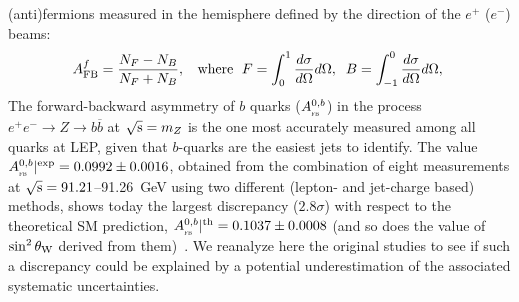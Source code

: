 \documentclass{moriond}
\newcommand{\sqrts}{\sqrt{\rm s}}
\newcommand{\epem}{e^+e^-}
\providecommand{\bbbar}{b\overline{b}}
\newcommand{\AFBb}  {A_{_{\textsc{fb}}}^{0,b}}
\newcommand{\weakang}  {\sin^2\theta_{\rm W}}
\begin{document}
(anti)fermions measured in the hemisphere defined by the direction of the $e^+$ ($e^-$) beams: %
\begin{eqnarray}
A_{\rm FB}^f=\frac{N_F-N_B}{N_F+N_B},\;\;\mbox{ where }\;F=\int_0^1 \frac{d\sigma}{d\Omega}d\Omega,\;\;B=\int_{-1}^0 \frac{d\sigma}{d\Omega}d\Omega,\;
\end{eqnarray}
The forward-backward asymmetry of $b$ quarks ($\AFBb$) in the process $\epem\to Z \to\bbbar$ at $\sqrts = m_Z$
is the one most accurately measured among all quarks at LEP, given that $b$-quarks are the easiest jets to identify. The 
value $\AFBb|^{\rm exp} = 0.0992\pm0.0016$, obtained from the combination of eight measurements at $\sqrts = 91.21$--91.26~GeV 
using two different (lepton- and jet-charge based) methods, shows today the largest discrepancy ($2.8\sigma$) 
with respect to the theoretical SM prediction, $\AFBb|^{\rm th} = 0.1037\pm0.0008$
(and so does the value of $\weakang$ derived from them)~\cite{ALEPH:2005ab}. %
We reanalyze here the original studies to see if such a discrepancy could be explained by a potential 
underestimation of the associated systematic uncertainties.

\end{document}
